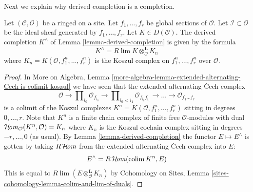 \noindent
Next we explain why derived completion is a completion.

\begin{lemma}
\label{lemma-derived-completion-koszul}
Let $(\mathcal{C}, \mathcal{O})$ be a ringed on a site. Let $f_1, \ldots, f_r$
be global sections of $\mathcal{O}$. Let $\mathcal{I} \subset \mathcal{O}$ be
the ideal sheaf generated by $f_1, \ldots, f_r$. Let $K \in D(\mathcal{O})$.
The derived completion $K^\wedge$ of Lemma \ref{lemma-derived-completion}
is given by the formula
$$
K^\wedge = R\lim K \otimes^\mathbf{L}_\mathcal{O} K_n
$$
where $K_n = K(\mathcal{O}, f_1^n, \ldots, f_r^n)$
is the Koszul complex on $f_1^n, \ldots, f_r^n$ over $\mathcal{O}$.
\end{lemma}

\begin{proof}
In More on Algebra, Lemma
\ref{more-algebra-lemma-extended-alternating-Cech-is-colimit-koszul}
we have seen that the extended alternating {\v C}ech complex
$$
\mathcal{O} \to \prod\nolimits_{i_0} \mathcal{O}_{f_{i_0}} \to
\prod\nolimits_{i_0 < i_1} \mathcal{O}_{f_{i_0}f_{i_1}} \to
\ldots \to \mathcal{O}_{f_1\ldots f_r}
$$
is a colimit of the Koszul complexes
$K^n = K(\mathcal{O}, f_1^n, \ldots, f_r^n)$ sitting in
degrees $0, \ldots, r$. Note that $K^n$ is a finite chain complex
of finite free $\mathcal{O}$-modules with dual
$\mathop{\mathcal{H}\!\mathit{om}}\nolimits_\mathcal{O}(K^n, \mathcal{O}) = K_n$ where $K_n$ is the Koszul
cochain complex sitting in degrees $-r, \ldots, 0$ (as usual). By
Lemma \ref{lemma-derived-completion}
the functor $E \mapsto E^\wedge$ is gotten by taking
$R\mathop{\mathcal{H}\!\mathit{om}}\nolimits$ from the extended alternating {\v C}ech complex into $E$:
$$
E^\wedge = R\mathop{\mathcal{H}\!\mathit{om}}\nolimits(\mathop{\mathrm{colim}}\nolimits K^n, E)
$$
This is equal to $R\lim (E \otimes_\mathcal{O}^\mathbf{L} K_n)$
by
Cohomology on Sites, Lemma \ref{sites-cohomology-lemma-colim-and-lim-of-duals}.
\end{proof}

